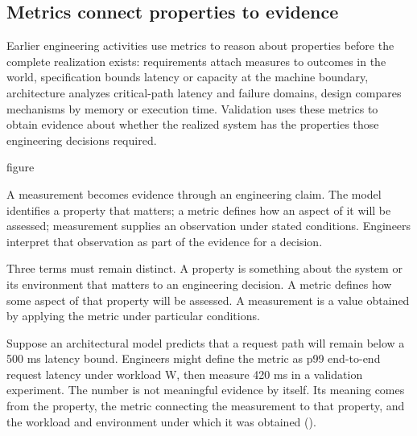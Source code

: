 \subsection{Metrics connect properties to evidence}\label{sec-metrics-evidence}

Earlier engineering activities use metrics to reason about properties before the complete
realization exists: requirements attach measures to outcomes in the world, specification bounds
latency or capacity at the machine boundary, architecture analyzes critical-path latency and
failure domains, design compares mechanisms by memory or execution time. Validation uses these
metrics to obtain evidence about whether the realized system has the properties those engineering
decisions required.

\begin{bookbox}{figure}{} %
\pandocbounded{}

A measurement becomes evidence through an engineering claim. The model identifies a property that
matters; a metric defines how an aspect of it will be assessed; measurement supplies an observation
under stated conditions. Engineers interpret that observation as part of the evidence for a decision.
\end{bookbox}

Three terms must remain distinct. A property is something about the system or its environment that
matters to an engineering decision. A metric defines how some aspect of that property will be
assessed. A measurement is a value obtained by applying the metric under particular conditions.

Suppose an architectural model predicts that a request path will remain below a 500 ms latency
bound. Engineers might define the metric as p99 end-to-end request latency under workload W, then
measure 420 ms in a validation experiment. The number is not meaningful evidence by itself. Its
meaning comes from the property, the metric connecting the measurement to that property, and the
workload and environment under which it was obtained (\citet{fig-property-to-judgment}).

